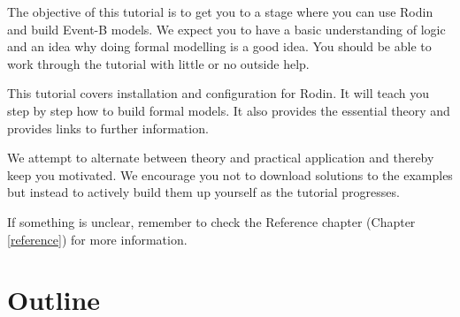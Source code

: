 
The objective of this tutorial is to get you to a stage where you can use Rodin and build Event-B models.  We expect you to have a basic understanding of logic and an idea why doing formal modelling is a good idea.  You should be able to work through the tutorial with little or no outside help.

This tutorial covers installation and configuration for Rodin. It will teach you step by step how to build formal models. It also provides the essential theory and provides links to further information.

We attempt to alternate between theory and practical application and thereby keep you motivated.  We encourage you not to download solutions to the examples but instead to actively build them up yourself as the tutorial progresses.

If something is unclear, remember to check the Reference chapter (Chapter \ref{reference}) for more information.

\section{Outline}
\label{tut_outline}

